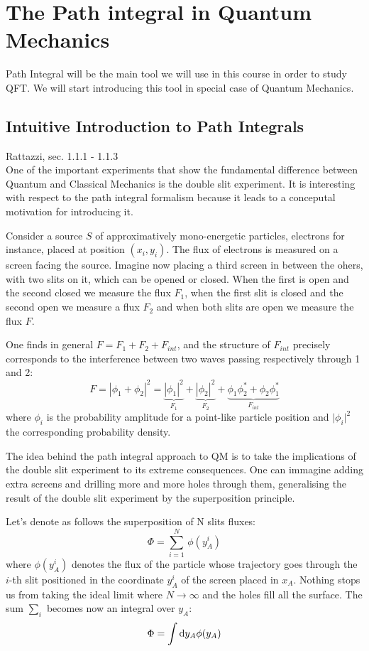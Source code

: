 \documentclass[../main/main.tex]{subfiles}
\begin{document}
\chapter{The Path integral in Quantum Mechanics}

Path Integral will be the main tool we will use in this course in order to study QFT.
We will start introducing this tool in special case of Quantum Mechanics.

\section{Intuitive Introduction to Path Integrals}
\textsf{Rattazzi, sec. 1.1.1 - 1.1.3}\\

One of the important experiments that show the fundamental difference between Quantum and Classical Mechanics is the double slit experiment. It is interesting with respect to the path integral formalism because it leads to a conceputal motivation for introducing it.

Consider a source $S$ of approximatively mono-energetic particles, electrons for instance, placed at position $(x_i,y_i)$. The flux of electrons is measured on a screen facing the source. Imagine now placing a third screen in between the ohers, with two slits on it, which can be opened or closed. When the first is open and the second closed we measure the flux $F_1$, when the first slit is closed and the second open we measure a flux $F_2$ and when both slits are open we measure the flux $F$.

One finds in general $F=F_1+F_2+F_{int}$, and the structure of $F_{int}$ precisely corresponds to the interference between two waves passing respectively through 1 and 2:
\[F=|\phi_1+\phi_2|^2=\underbrace{|\phi_1|^2}_{F_1}+\underbrace{|\phi_2|^2}_{F_2}+\underbrace{\phi_1\phi_2^*+\phi_2\phi_1^*}_{F_{int}}\]
where $\phi_i$ is the probability amplitude for a point-like particle position and $\vert\phi_i\vert^2$ the corresponding probability density.

The idea behind the path integral approach to QM is to take the implications of the double slit experiment to its extreme consequences. One can immagine adding extra screens and drilling more and more holes through them, generalising the result of the double slit experiment by the superposition principle.

Let's denote as follows the superposition of N slits fluxes:
\[\Phi={\sum_{i=1}^N}\,\phi(y^i_A)\]
where $\phi(y^i_A)$ denotes the flux of the particle whose trajectory goes through the $i$-th slit positioned in the coordinate $y^i_A$ of the screen placed in $x_A$.
Nothing stops us from taking the ideal limit where $N\to\infty$ and the holes fill all the surface. The sum $\sum_i$ becomes now an integral over $y_A$:
\[\Phi=\int\textup{d} y_A\phi(y_A)\]
\end{document}
